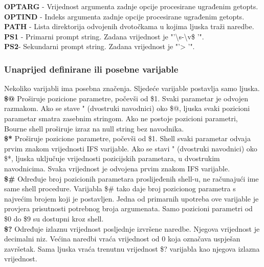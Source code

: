 \documentclass[11pt]{book}
\begin{document}
\textbf{OPTARG} - Vrijednost argumenta zadnje opcije procesirane ugrađenim getopts.\\

\textbf{OPTIND} - Indeks argumenta zadnje opcije procesirane ugrađenim getopts.\\

\textbf{PATH} - Lista direktorija odvojenih dvotočkama u kojima ljuska traži naredbe.\\

\textbf{PS1} - Primarni prompt string. Zadana vrijednost je "'\textbackslash s-\textbackslash v\$ '".\\

\textbf{PS2}- Sekundarni prompt string. Zadana vrijednost je "'> '".\\

\subsubsection{Unaprijed definirane ili posebne varijable}
Nekoliko varijabli ima posebna značenja. Sljedeće varijable postavlja samo ljuska.\\

\textbf{\$@} Proširuje pozicione parametre, počevši od \$1. Svaki parametar je odvojen razmakom. Ako se stave " (dvostruki navodnici) oko \$@, ljuska svaki pozicioni parametar smatra zasebnim stringom. Ako ne postoje pozicioni parametri, Bourne shell proširuje izraz na null string bez navodnika.\\

\textbf{\$*} Proširuje pozicione parametre, počevši od \$1. Shell svaki parametar odvaja prvim znakom vrijednosti IFS varijable. Ako se stavi " (dvostruki navodnici) oko \$*, ljuska uključuje vrijednosti pozicijskih parametara, u dvostrukim navodnicima. Svaka vrijednost je odvojena prvim znakom IFS varijable.\\

\textbf{\$\#} Određuje broj pozicionih parametara proslijeđenih shell-u, ne računajući ime same shell procedure. Varijabla \$\# tako daje broj pozicionog parametra s najvećim brojem koji je postavljen. Jedna od primarnih upotreba ove varijable je provjera prisutnosti potrebnog broja argumenata. Samo pozicioni parametri od \$0 do \$9 su dostupni kroz shell.\\

\textbf{\$?} Određuje izlaznu vrijednost posljednje izvršene naredbe. Njegova vrijednost je decimalni niz. Većina naredbi vraća vrijednost od 0 koja označava uspješan završetak. Sama ljuska vraća trenutnu vrijednost \$? varijabla kao njegova izlazna vrijednost.\\
\end{document}

